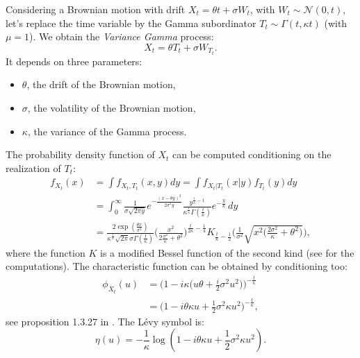\documentclass[]{interact}
\theoremstyle{plain}%
\theoremstyle{definition}
\theoremstyle{remark}
\begin{document}
Considering a Brownian motion with drift $X_t = \theta t + \sigma W_t$, with $W_t \sim \mathcal{N}(0,t)$, let's replace the time variable by the Gamma 
subordinator $T_t \sim \Gamma(t,\kappa t)$ (with $\mu=1$).
We obtain the \emph{Variance Gamma} process:
\begin{equation}\label{VG_process}
 X_{t} = \theta T_t + \sigma W_{T_t} .
\end{equation}
It depends on three parameters:
\begin{itemize}
 \item $\theta$, the drift of the Brownian motion,	
 \item $\sigma$, the volatility of the Brownian motion,
 \item $\kappa$, the variance of the Gamma process.
\end{itemize}
The probability density function of $X_t$ can be computed conditioning on the realization of $T_t$:
\begin{align}\label{pdf_VG}
 f_{X_t}(x) &= \int f_{X_t,T_t}(x,y) dy = \int f_{X_t|T_t}(x|y) f_{T_t}(y) dy \\ \nonumber
         &= \int_0^{\infty} \frac{1}{\sigma \sqrt{2\pi y}} e^{-\frac{(x -\theta y)^2}{2\sigma^2 y}}
         \frac{y^{\frac{t}{\kappa} -1}}{\kappa^{\frac{t}{\kappa}} \Gamma(\frac{t}{\kappa})}
          e^{-\frac{y}{\kappa}} \, dy \\ \nonumber
         &= \frac{2 \exp(\frac{\theta x}{\sigma^2})}{\kappa^{\frac{t}{\kappa}} \sqrt{2\pi}\sigma \Gamma(\frac{t}{\kappa}) }
            \biggl( \frac{x^2}{2\frac{\sigma^2}{\kappa} + \theta^2} \biggr)^{\frac{t}{2\kappa}-\frac{1}{4}} 
            K_{\frac{t}{\kappa}-\frac{1}{2}} 
            \biggl( \frac{1}{\sigma^2} \sqrt{x^2 \bigl(\frac{2\sigma^2}{\kappa}+\theta^2 \bigr)} \biggr),
\end{align}
where the function $K$ is a modified Bessel function of the second kind (see \cite{MCC98} for the computations).
The characteristic function can be obtained by conditioning too: 
\begin{align}
 \phi_{X_t}(u) &= \biggl( 1-i \kappa \bigl( u\theta +\frac{i}{2}\sigma^2 u^2 \bigr) \biggr)^{-\frac{t}{\kappa}} \\  
	       &= \biggl( 1-i\theta \kappa u + \frac{1}{2} \sigma^2 \kappa u^2 \biggr)^{-\frac{t}{\kappa}},
\end{align}
see proposition 1.3.27 in \cite{Applebaum}. 
The Lévy symbol is:
\begin{equation}\label{Levy_exp_VG}
 \eta(u) = -\frac{1}{\kappa} \log(1-i\theta \kappa u + \frac{1}{2} \sigma^2 \kappa u^2).
\end{equation}
\end{document}
